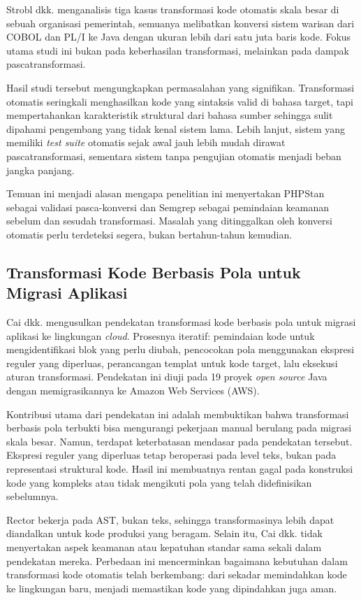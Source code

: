     Strobl dkk. \cite{strobl2020automated} menganalisis tiga kasus transformasi kode otomatis skala besar di sebuah organisasi pemerintah, semuanya melibatkan konversi sistem warisan dari COBOL dan PL/I ke Java dengan ukuran lebih dari satu juta baris kode. Fokus utama studi ini bukan pada keberhasilan transformasi, melainkan pada dampak pascatransformasi.

    Hasil studi tersebut mengungkapkan permasalahan yang signifikan. 
Transformasi otomatis seringkali menghasilkan kode yang sintaksis 
valid di bahasa target, tapi mempertahankan karakteristik struktural 
dari bahasa sumber sehingga sulit dipahami pengembang yang tidak 
kenal sistem lama. Lebih lanjut, sistem yang memiliki \textit{test 
suite} otomatis sejak awal jauh lebih mudah dirawat pascatransformasi, 
sementara sistem tanpa pengujian otomatis menjadi beban jangka panjang.

    Temuan ini menjadi alasan mengapa penelitian ini menyertakan PHPStan sebagai validasi pasca-konversi dan Semgrep sebagai pemindaian keamanan sebelum dan sesudah transformasi. Masalah yang ditinggalkan oleh konversi otomatis perlu terdeteksi segera, bukan bertahun-tahun kemudian.

    \subsection{Transformasi Kode Berbasis Pola untuk Migrasi Aplikasi}

    Cai dkk. \cite{cai2015pattern} mengusulkan pendekatan transformasi kode berbasis pola untuk migrasi aplikasi ke lingkungan \textit{cloud}. Prosesnya iteratif: pemindaian kode untuk mengidentifikasi blok yang perlu diubah, pencocokan pola menggunakan ekspresi reguler yang diperluas, perancangan templat untuk kode target, lalu eksekusi aturan transformasi. Pendekatan ini diuji pada 19 proyek \textit{open source} Java dengan memigrasikannya ke Amazon Web Services (AWS).

    Kontribusi utama dari pendekatan ini adalah membuktikan bahwa transformasi berbasis pola terbukti bisa mengurangi pekerjaan manual berulang pada migrasi skala besar. Namun, terdapat keterbatasan mendasar pada pendekatan tersebut. Ekspresi reguler yang diperluas tetap beroperasi pada level teks, bukan pada representasi struktural kode. Hasil ini membuatnya rentan gagal pada konstruksi kode yang kompleks atau tidak mengikuti pola yang telah didefinisikan sebelumnya.

    Rector \cite{rector2024} bekerja pada AST, bukan teks, sehingga transformasinya lebih dapat diandalkan untuk kode produksi yang beragam. Selain itu, Cai dkk. \cite{cai2015pattern} tidak menyertakan aspek keamanan atau kepatuhan standar sama sekali dalam pendekatan mereka. Perbedaan ini mencerminkan bagaimana kebutuhan dalam transformasi kode otomatis telah berkembang: dari sekadar memindahkan kode ke lingkungan baru, menjadi memastikan kode yang dipindahkan juga aman.

